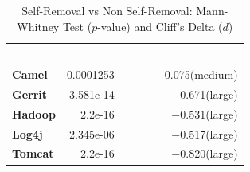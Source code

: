 


\begin{table}[t]
	\begin{center}
		\caption{Self-Removal vs Non Self-Removal: Mann-Whitney Test ($p$-value) and Cliff's Delta ($d$)}
		\label{tbl:statistic}
		\begin{tabular}{l| rrr}
			\toprule
			\textbf{\thead{Project}} & \textbf{\thead{$p$-value}}&~~~ & \textbf{\thead{$d$}}\\ 
			\midrule
			\textbf{Camel }   &  0.0001253& ~~~ &  $-$0.075(medium)  \\  
			\textbf{Gerrit}   &  3.581e-14& ~~~ &  $-$0.671(large)  \\  
			\textbf{Hadoop}   &   2.2e-16& ~~~ &  $-$0.531(large)  \\  
			\textbf{Log4j}   &  2.345e-06 & ~~~ &  $-$0.517(large)  \\  
			\textbf{Tomcat}   &  2.2e-16  & ~~~ &  $-$0.820(large) \\  
			\bottomrule
		\end{tabular}
	\end{center} 
	\vspace{-0.1in}   
\end{table}












